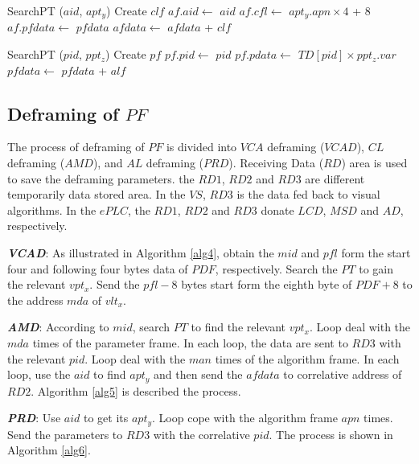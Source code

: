 \documentclass[journal,UTF8]{IEEEtran}
\begin{document}
\begin{algorithm}
	\label{alg2}
	\caption{$AMF$}%
	SearchPT ($aid$, $apt_y$)\;
	Create $clf$\;
	$af.aid\leftarrow$ $aid$\;
	$af.cfl \leftarrow$ $apt_y.apn \times 4$ + 8\;
	$af.pfdata \leftarrow$ $pfdata$\;	
	$afdata\leftarrow$ $afdata$ + $clf$\;	 
\end{algorithm}
\begin{algorithm}
	\label{alg3}
	\caption{$PRF$}%
	SearchPT ($pid$, $ppt_z$)\;
	Create $pf$\;
	$pf.pid\leftarrow$ $pid$\; %
	$pf.pdata \leftarrow$ $TD[pid]\times ppt_z.var$\;
	$pfdata\leftarrow$ $pfdata$ + $alf$\;	 
\end{algorithm}

\subsection{Deframing of $PF$}
 The process of deframing of $PF$ is divided into $VCA$ deframing ($VCAD$), $CL$ deframing ($AMD$), and $AL$ deframing ($PRD$). Receiving Data ($RD$) area is used to save the deframing parameters. the $RD1$, $RD2$ and $RD3$ are different temporarily data stored area. In the $VS$, $RD3$ is the data fed back to visual algorithms. In the $ePLC$, the $RD1$, $RD2$ and $RD3$ donate $LCD$, $MSD$ and $AD$, respectively.

\textbf{\emph{VCAD}}: As illustrated in Algorithm \ref{alg4}, obtain the $mid$ and $pfl$ form the start four and following four bytes data of $PDF$, respectively. Search the $PT$ to gain the relevant $vpt_x$. Send the $pfl-8$ bytes start form the eighth byte of $PDF+8$ to the address $mda$ of $vlt_x$.

\textbf{\emph{AMD}}: According to $mid$, search $PT$ to find the relevant $vpt_x$. Loop deal with the $mda$ times of the parameter frame. In each loop, the data are sent to $RD3$ with the relevant $pid$. Loop deal with the $man$ times of the algorithm frame. In each loop, use the $aid$ to find $apt_y$ and then send the $afdata$ to correlative address of $RD2$. Algorithm \ref{alg5} is described the process.

\textbf{\emph{PRD}}: Use $aid$ to get its $apt_y$. Loop cope with the algorithm frame $apn$ times. Send the parameters to $RD3$ with the correlative $pid$. The process is shown in Algorithm \ref{alg6}.
\end{document}

